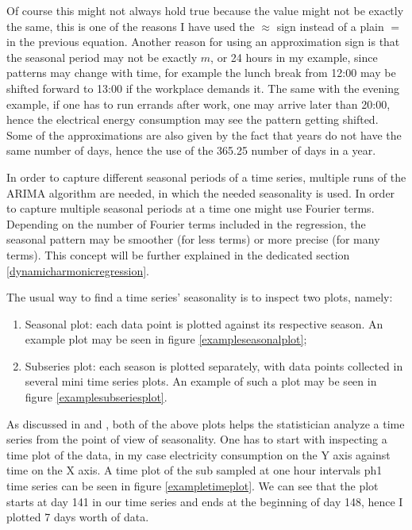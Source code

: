 \documentclass[12pt,a4paper,titlepage]{report}
\begin{document}
Of course this might not always hold true because the value might not be exactly the same, this is one of the reasons I have used the $ \approx $ sign instead of a plain $ = $ in the previous equation. Another reason for using an approximation sign is that the seasonal period may not be exactly $ m $, or 24 hours in my example, since patterns may change with time, for example the lunch break from 12:00 may be shifted forward to 13:00 if the workplace demands it. The same with the evening example, if one has to run errands after work, one may arrive later than 20:00, hence the electrical energy consumption may see the pattern getting shifted. Some of the approximations are also given by the fact that years do not have the same number of days, hence the use of the 365.25 number of days in a year.

In order to capture different seasonal periods of a time series, multiple runs of the ARIMA algorithm are needed, in which the needed seasonality is used. In order to capture multiple seasonal periods at a time one might use Fourier terms. Depending on the number of Fourier terms included in the regression, the seasonal pattern may be smoother (for less terms) or more precise (for many terms). This concept will be further explained in the dedicated section \ref{dynamicharmonicregression}.

The usual way to find a time series' seasonality is to inspect two plots, namely:
\begin{enumerate}
    \item Seasonal plot: each data point is plotted against its respective season. An example plot may be seen in figure \ref{exampleseasonalplot};
    \item Subseries plot: each season is plotted separately, with data points collected in several mini time series plots. An example of such a plot may be seen in figure \ref{examplesubseriesplot}.
\end{enumerate}

As discussed in \cite{fpp2seasonalplot} and \cite{fpp2subseriesplot}, both of the above plots helps the statistician analyze a time series from the point of view of seasonality.
One has to start with inspecting a time plot of the data, in my case electricity consumption on the Y axis against time on the X axis. A time plot of the sub sampled at one hour intervals ph1 time series can be seen in figure \ref{exampletimeplot}. We can see that the plot starts at day 141 in our time series and ends at the beginning of day 148, hence I plotted 7 days worth of data.
\end{document}

